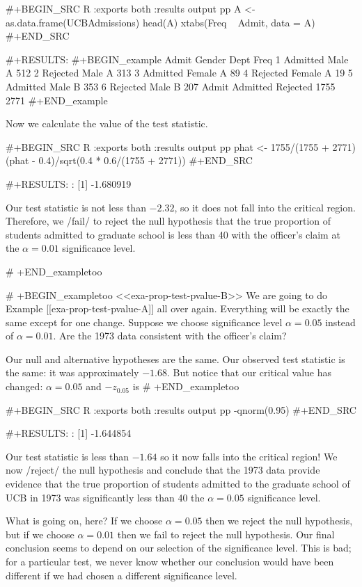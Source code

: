 #+BEGIN_SRC R :exports both :results output pp 
A <- as.data.frame(UCBAdmissions)
head(A)
xtabs(Freq ~ Admit, data = A)
#+END_SRC

#+RESULTS:
#+BEGIN_example
     Admit Gender Dept Freq
1 Admitted   Male    A  512
2 Rejected   Male    A  313
3 Admitted Female    A   89
4 Rejected Female    A   19
5 Admitted   Male    B  353
6 Rejected   Male    B  207
Admit
Admitted Rejected 
    1755     2771
#+END_example

Now we calculate the value of the test statistic.

#+BEGIN_SRC R :exports both :results output pp 
phat <- 1755/(1755 + 2771)
(phat - 0.4)/sqrt(0.4 * 0.6/(1755 + 2771)) 
#+END_SRC

#+RESULTS:
: [1] -1.680919

Our test statistic is not less than \(-2.32\), so it does not fall
into the critical region. Therefore, we /fail/ to reject the null
hypothesis that the true proportion of students admitted to graduate
school is less than 40%
with the officer's claim at the \(\alpha = 0.01\) significance level.

# +END_exampletoo


# +BEGIN_exampletoo
<<exa-prop-test-pvalue-B>> We are going to do Example
[[exa-prop-test-pvalue-A]] all over again. Everything will be exactly the
same except for one change. Suppose we choose significance level
\(\alpha = 0.05\) instead of \(\alpha = 0.01\). Are the 1973 data
consistent with the officer's claim?

Our null and alternative hypotheses are the same. Our observed test
statistic is the same: it was approximately \(-1.68\). But notice that
our critical value has changed: \(\alpha = 0.05\) and \(-z_{0.05}\) is
# +END_exampletoo

#+BEGIN_SRC R :exports both :results output pp 
-qnorm(0.95)
#+END_SRC

#+RESULTS:
: [1] -1.644854

Our test statistic is less than \(-1.64\) so it now falls into the
critical region! We now /reject/ the null hypothesis and conclude that
the 1973 data provide evidence that the true proportion of students
admitted to the graduate school of UCB in 1973 was significantly less
than 40%
the \(\alpha = 0.05\) significance level.

What is going on, here? If we choose \(\alpha = 0.05\) then we reject
the null hypothesis, but if we choose \(\alpha = 0.01\) then we fail
to reject the null hypothesis. Our final conclusion seems to depend on
our selection of the significance level. This is bad; for a particular
test, we never know whether our conclusion would have been different
if we had chosen a different significance level.

